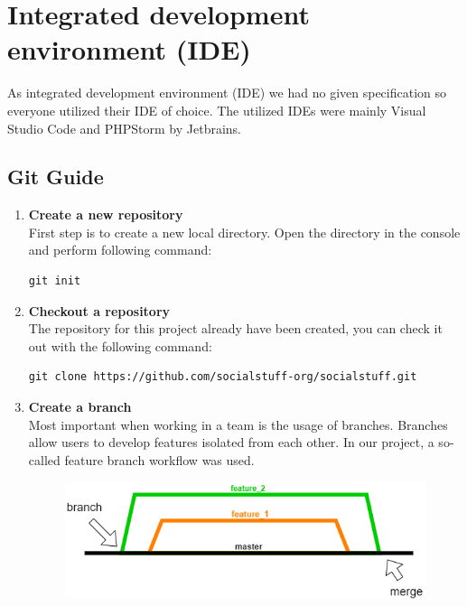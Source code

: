 \section{Integrated development environment (IDE)}\label{sec:integrated-development-environment-(ide)}

As integrated development environment (IDE) we had no given specification so everyone utilized their IDE of choice.
The utilized IDEs were mainly Visual Studio Code and PHPStorm by Jetbrains.

\subsection{Git Guide}\label{subsec:git-guide}

\begin{enumerate}
    \item \textbf{Create a new repository} \\
    First step is to create a new local directory.
    Open the directory in the console and perform following command:
    \begin{lstlisting}[label={lst:lstlisting2}]
		git init
    \end{lstlisting}
    \item \textbf{Checkout a repository} \\
    The repository for this project already have been created, you can check it out with the following command:
    \begin{lstlisting}[label={lst:lstlisting2}]
		git clone https://github.com/socialstuff-org/socialstuff.git
    \end{lstlisting}
    \item \textbf{Create a branch} \\
    Most important when working in a team is the usage of branches.
    Branches allow users to develop features isolated from each other.
    In our project, a so-called feature branch workflow was used.
    \begin{figure}[h]
        \centering
        \includegraphics[width=1.0\textwidth]{./images/git_branching}

\end{figure}
\end{enumerate}
